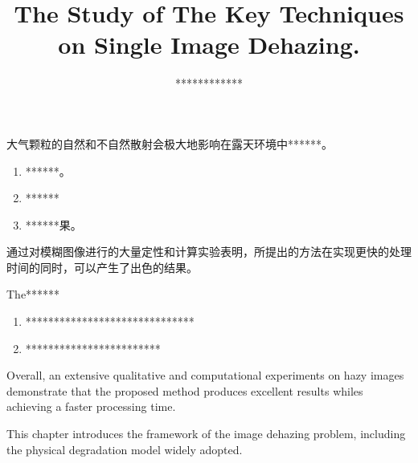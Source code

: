 \documentclass[doctor,english,listoffigures,listoftables]{thesis-uestc}
\title{The Study of The Key Techniques on Single Image Dehazing.}
\author{************}{Jehoiada ************}
\begin{document}
\makecover

\begin{chineseabstract}
大气颗粒的自然和不自然散射会极大地影响在露天环境中******。

\begin{enumerate}
	\item ******。 
	
	\item ******
	
	\item ******果。
	
	

	
\end{enumerate}
通过对模糊图像进行的大量定性和计算实验表明，所提出的方法在实现更快的处理时间的同时，可以产生了出色的结果。

\end{chineseabstract}

\begin{englishabstract}
The****** 
\begin{enumerate}
	\item   ******************************
	\item  ************************ 
\end{enumerate}
Overall, an extensive qualitative and computational experiments on hazy images demonstrate that the proposed method produces excellent results whiles achieving a faster processing time.

\end{englishabstract}

\thesistableofcontents
\thesisfigurelist
\thesistablelist
\thesischapterexordium

This chapter introduces the framework of the image dehazing problem, including the physical degradation model widely adopted. 
\end{document}
